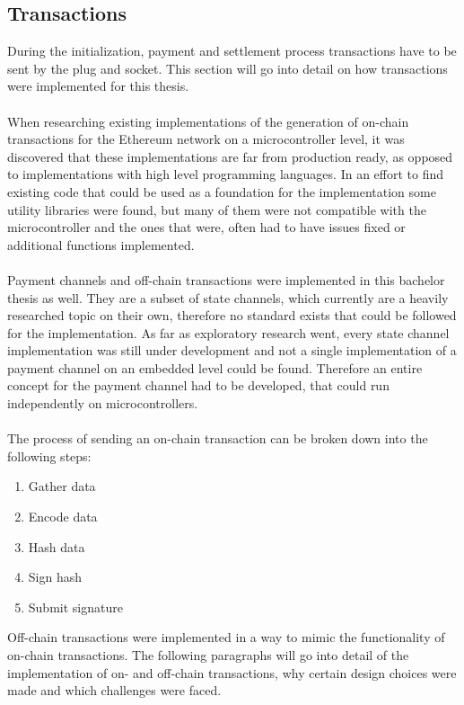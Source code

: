 \subsection{Transactions}
During the initialization, payment and settlement process transactions have to be sent by the plug and socket.
This section will go into detail on how transactions were implemented for this thesis.
\\\\
When researching existing implementations of the generation of on-chain transactions for the Ethereum network on a microcontroller level, it was discovered that these implementations are far from production ready, as opposed to implementations with high level programming languages.
In an effort to find existing code that could be used as a foundation for the implementation some utility libraries were found, but many of them were not compatible with the microcontroller and the ones that were, often had to have issues fixed or additional functions implemented.
\\\\
Payment channels and off-chain transactions were implemented in this bachelor thesis as well.
They are a subset of state channels, which currently are a heavily researched topic on their own, therefore no standard exists that could be followed for the implementation.
As far as exploratory research went, every state channel implementation was still under development and not a single implementation of a payment channel on an embedded level could be found\cite{state-channels}.
Therefore an entire concept for the payment channel had to be developed, that could run independently on microcontrollers.
\\\\
The process of sending an on-chain transaction can be broken down into the following steps: 
\begin{enumerate}
    \item Gather data
    \item Encode data
    \item Hash data
    \item Sign hash
    \item Submit signature
\end{enumerate}
Off-chain transactions were implemented in a way to mimic the functionality of on-chain transactions.
The following paragraphs will go into detail of the implementation of on- and off-chain transactions, why certain design choices were made and which challenges were faced.
\\\\\\
